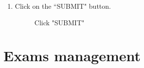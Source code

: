 \documentclass[ManualeUtente]{subfiles}
\begin{document}
\begin{enumerate}
		\item Click on the \textquotedblleft SUBMIT" button.
		\begin{figure}[H]
			\centering
			\caption{Click "SUBMIT"}
			\label{fig:Click "SUBMIT"}
		\end{figure}
	\end{enumerate}
	\newpage
	\section{Exams management}
\end{document}
